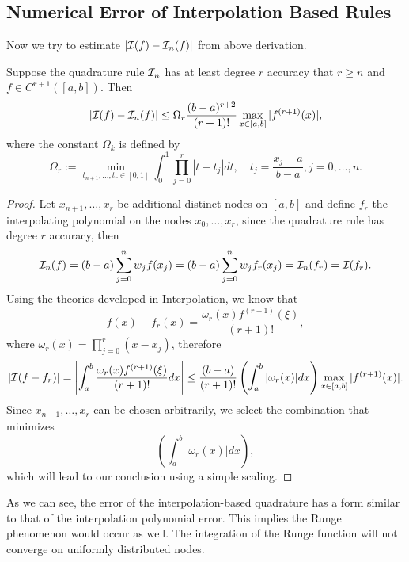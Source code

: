 \subsection{Numerical Error of Interpolation Based Rules}
\label{SSec: 3-Num-Err-Int-Bas-Rul}
Now we try to estimate $|\mathcal I(f) - \mathcal I_n(f)|$ from above derivation. 
\begin{theorem}\label{THM: ERROR QUAD RULE}Suppose the quadrature rule $\mathcal I_n$ has at least degree $r$ accuracy that $r\ge n$ and $f\in C^{r+1}([a, b])$. 
    Then 
    \begin{equation}
        |\mathcal I(f) - \mathcal I_n(f)| \le \Omega_r \frac{(b-a)^{r+2}}{(r+1)!} \max_{x\in[a, b]} |f^{(r+1)}(x)|,
    \end{equation}
    where the constant $\Omega_k$ is defined by 
    \begin{equation}
        \Omega_r := \min_{t_{n+1}, \dots, t_r\in [0, 1]} \int_0^1 \prod_{j=0}^r |t - t_j| dt, \quad t_j = \frac{x_j - a}{b-a}, j=0,\dots, n.
    \end{equation}
\end{theorem}
\begin{proof}
    Let $x_{n+1}, \dots, x_{r}$ be additional distinct nodes on $[a, b]$ and define $f_r$ the interpolating polynomial on the nodes $x_0,\dots, x_r$, since the quadrature rule has degree $r$ accuracy, then 
    $$\mathcal I_n(f) = (b-a)\sum_{j=0}^n w_j f(x_j) = (b-a)\sum_{j=0}^n w_j f_r(x_j) = \mathcal I_n(f_r) = \mathcal I(f_r).$$
    Using the theories developed in Interpolation, we know that 
\begin{equation}
    f(x) - f_r(x) = \frac{\omega_r(x) f^{(r+1)}(\xi)}{(r+1)!},
\end{equation}
where $\omega_r(x) = \prod_{j=0}^r (x - x_j)$, therefore 
\begin{equation}
   | \mathcal I(f - f_r)| = \left| \int_a^b \frac{\omega_r(x) f^{(r+1)}(\xi)}{(r+1)!} dx \right|\le \frac{(b-a)}{(r+1)!} \left(\int_a^b |\omega_r(x)|dx \right)  \max_{x\in[a,b]}|f^{(r+1)}(x)|.
\end{equation}
Since $x_{n+1},\dots, x_r$ can be chosen arbitrarily, we select the combination that minimizes $$  \left(\int_a^b |\omega_r(x)|dx \right),$$ which will lead to our conclusion using a simple scaling.
\end{proof}
\begin{remark}
    As we can see, the error of the interpolation-based quadrature has a form similar to that of the interpolation polynomial error. This implies the Runge phenomenon would occur as well. The integration of the Runge function will not converge on uniformly distributed nodes.
\end{remark}
